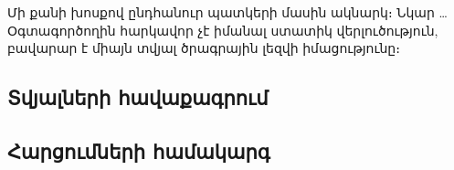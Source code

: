 {
	Մի քանի խոսքով ընդհանուր պատկերի մասին ակնարկ։ Նկար \ldots
	Օգտագործողին հարկավոր չէ իմանալ ստատիկ վերլուծություն, բավարար է միայն տվյալ ծրագրային լեզվի իմացությունը։

	\subsection{Տվյալների հավաքագրում}\label{subsec:dataCollection}
	

	\subsection{Հարցումների համակարգ}\label{subsec:queries}
	
}
